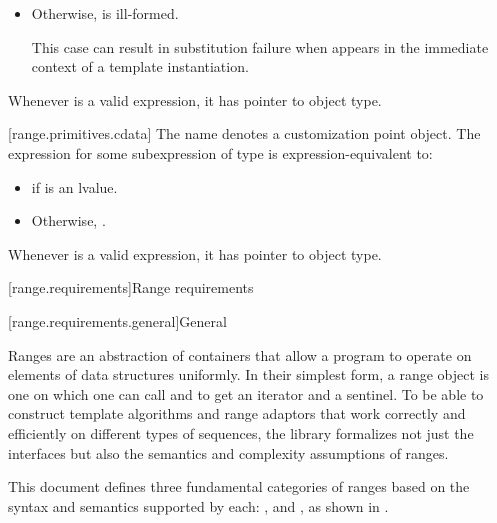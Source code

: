 \begin{addedblock}
\begin{itemize}
\item
  Otherwise,  is ill-formed.
  {\color{newclr}
  \begin{note}
  This case can result in substitution failure when 
  appears in the immediate context of a template instantiation.
  \end{note}
  } %
\end{itemize}

\pnum
\begin{note}
Whenever  is a valid expression, it
has pointer to object type.
\end{note}

[range.primitives.cdata]{}
\pnum
The name  denotes a customization point
object. The expression
 for some subexpression  of type 
is expression-equivalent to:
\begin{itemize}
\item {} if  is an lvalue.

\item Otherwise, .
\end{itemize}

\pnum
\begin{note}
Whenever  is a valid expression, it
has pointer to object type.
\end{note}

[range.requirements]{Range requirements}

[range.requirements.general]{General}

\pnum
Ranges are an abstraction of containers that allow a \Cpp program to
operate on elements of data structures uniformly. In their simplest form, a
range object is one on which one can call  and
 to get an iterator and a
sentinel. To be able to construct
template algorithms and range adaptors that work correctly and efficiently on
different types of sequences, the library formalizes not just the interfaces but
also the semantics and complexity assumptions of ranges.

\pnum
This document defines three fundamental categories of ranges
based on the syntax and semantics supported by each: ,
 and , as shown in
.


\end{addedblock}
